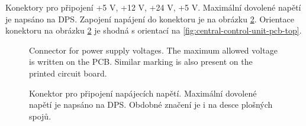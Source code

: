 \begin{Czech}
Konektory pro připojení +5 V, +12 V, +24 V, +5 V. Maximální dovolené napětí je napsáno na DPS. Zapojení napájení do konektoru je na obrázku \ref{fig:central-control-unit-terminal-blocks-power-supply}. Orientace konektoru na obrázku \ref{fig:central-control-unit-terminal-blocks-power-supply} je shodná s orientací na \ref{fig:central-control-unit-pcb-top}.
\end{Czech}


\begin{English}
\begin{figure}[H]
    \centering
    \def\svgwidth{0.15\columnwidth}
    \graphicspath{{pictures/all/hardware/svg/}}
    
    \caption{Connector for power supply voltages. The maximum allowed voltage is written on the PCB. Similar marking is also present on the printed circuit board.}
    \label{fig:central-control-unit-terminal-blocks-power-supply}
\end{figure}
\end{English}

\begin{Czech}
\begin{figure}[H]
    \centering
    \def\svgwidth{0.15\columnwidth}
    \graphicspath{{pictures/all/hardware/svg/}}
    
    \caption{Konektor pro připojení napájecích napětí. Maximální dovolené napětí je napsáno na DPS. Obdobné značení je i na desce plošných spojů.}
    \label{fig:central-control-unit-terminal-blocks-power-supply}
\end{figure}
\end{Czech}


\begin{English}
\end{English}

\begin{Czech}
\end{Czech}


\begin{English}
\end{English}

\begin{Czech}
\end{Czech}


